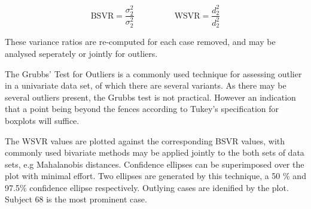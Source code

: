 \documentclass[12pt, a4paper]{report}
\theoremstyle{plain}
\theoremstyle{definition}
\theoremstyle{remark}
\begin{document}
\[ \mbox{BSVR} = \frac{\sigma^2_2}{\sigma^2_2} \phantom{makespace}  \mbox{WSVR} = \frac{d^2_2}{d^2_2} \]

These variance ratios are re-computed for each case removed, and may be analysed seperately or jointly for outliers.




The Grubbs' Test for Outliers is a commonly used technique for assessing outlier in a univariate data set, of which there are several variants.
As there may be several outliers present, the Grubbs test is not practical. However an indication that a point being beyond the fences according to Tukey's specification for boxplots will suffice.


% 



The WSVR values are plotted against the corresponding BSVR values, with commonly used bivariate methods may be applied jointly to the both sets of data sets, e.g Mahalanobis distances. Confidence ellipses can be superimposed over the plot with minimal effort. Two ellipses are generated by this technique, a 50 \% and 97.5\% confidence ellipse respectively. Outlying cases are idenified by the plot. Subject 68 is the most prominent case.
\end{document}
